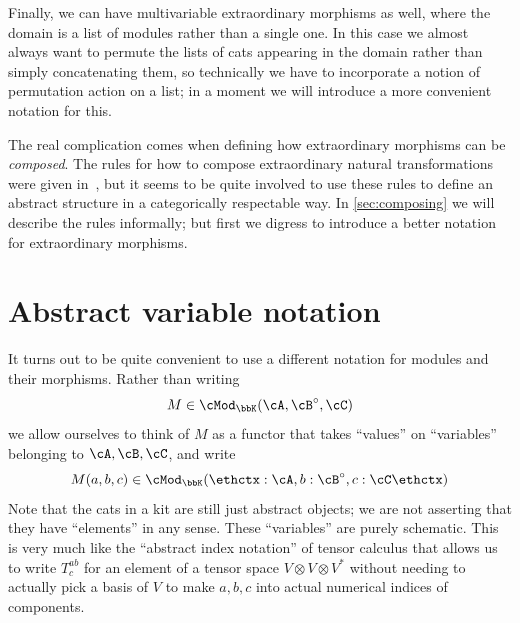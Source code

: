 \documentclass{amsart}
\makeatletter
\newcommand{\A}{\cA}
\newcommand{\B}{\cB}
\newcommand{\C}{\cC}
\newcommand{\K}{\bbK}
\let\mod\cMod
\def\modk{\mod_\K}
\renewcommand{\o}{^{\circ}}
\let\vdash\Longrightarrow
\def\types{\;\vdash\;} %
\def\modkv#1{\modk({\thctx #1\ethctx})}
\def\thctx#1\ethctx{\@@ctx#1,,}
\def\thincolon#1:#2\endtc{#1\mathord{:}#2}
\def\@@ctx#1,{\@ifmtarg{#1}{\let\next=\relax}{\thincolon#1\endtc\let\next=\@@@ctx}\next}
\def\@@@ctx#1,{\@ifmtarg{#1}{\let\next=\relax}{,\thincolon#1\endtc\let\next=\@@@ctx}\next}
\makeatother
\begin{document}
Finally, we can have multivariable extraordinary morphisms as well, where the domain is a list of modules rather than a single one.
In this case we almost always want to permute the lists of cats appearing in the domain rather than simply concatenating them, so technically we have to incorporate a notion of permutation action on a list; in a moment we will introduce a more convenient notation for this.

The real complication comes when defining how extraordinary morphisms can be \emph{composed}.
The rules for how to compose extraordinary natural transformations were given in~\cite{ek:gen-funct-calc}, but it seems to be quite involved to use these rules to define an abstract structure in a categorically respectable way.
In \cref{sec:composing} we will describe the rules informally; but first we digress to introduce a better notation for extraordinary morphisms.


\section{Abstract variable notation}
\label{sec:tt}

It turns out to be quite convenient to use a different notation for modules and their morphisms.
Rather than writing
\[ M \in \modk(\A,\B\o,\C) \]
we allow ourselves to think of $M$ as a functor that takes ``values'' on ``variables'' belonging to $\A,\B,\C$, and write
\[ M(a,b,c) \in \modkv{a:\A,b:\B\o,c:\C} \]
Note that the cats in a kit are still just abstract objects; we are not asserting that they have ``elements'' in any sense.
These ``variables'' are purely schematic.
This is very much like the ``abstract index notation'' of tensor calculus that allows us to write $T^{a b}_{c}$ for an element of a tensor space $V \otimes V\otimes V^*$ without needing to actually pick a basis of $V$ to make $a,b,c$ into actual numerical indices of components.
\end{document}

